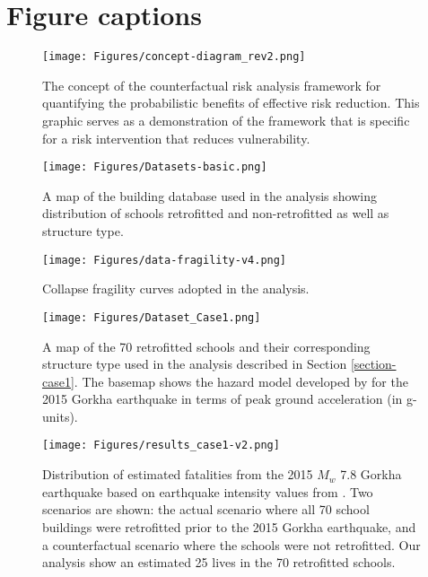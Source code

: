 \documentclass[utf8]{frontiersSCNS} %
\begin{document}

\section*{Figure captions}

\begin{figure}[h!] 
\begin{center}
    \texttt{[image: Figures/concept-diagram\_rev2.png]}
    \caption{The concept of the counterfactual risk analysis framework for quantifying the probabilistic benefits of effective risk reduction. This graphic serves as a demonstration of the framework that is specific for a risk intervention that reduces vulnerability.}
    \label{fig:conceptual_diagram}
\end{center}
\end{figure}

\begin{figure}[h!] 
\begin{center}
    \texttt{[image: Figures/Datasets-basic.png]}
	\caption{A map of the building database used in the analysis showing distribution of schools retrofitted and non-retrofitted as well as structure type.}
	\label{fig:data-all}
\end{center}
\end{figure}

\begin{figure}[h!]
\begin{center}
    \texttt{[image: Figures/data-fragility-v4.png]}
    \caption{Collapse fragility curves adopted in the analysis.}
    \label{fig:frag_curves}
\end{center}
\end{figure}

\begin{figure}[h!] 
\begin{center}
    \texttt{[image: Figures/Dataset\_Case1.png]}
	\caption{A map of the 70 retrofitted schools and their corresponding structure type used in the analysis described in Section \ref{section-case1}. The basemap shows the hazard model developed by \cite{chen20192015} for the 2015 Gorkha earthquake in terms of peak ground acceleration (in g-units).}
	\label{fig:datacase1}
\end{center}
\end{figure}

\begin{figure}[h!] 
\begin{center} 
    \texttt{[image: Figures/results\_case1-v2.png]}
	\caption{Distribution of estimated fatalities from the 2015 $M_{w}$ 7.8 Gorkha earthquake based on earthquake intensity values from \cite{chen20192015}. Two scenarios are shown: the actual scenario where all 70 school buildings were retrofitted prior to the 2015 Gorkha earthquake, and a counterfactual scenario where the schools were not retrofitted. Our analysis show an estimated 25 lives in the 70 retrofitted schools.}
\label{fig:results_case1}
\end{center}
\end{figure}
\end{document}
